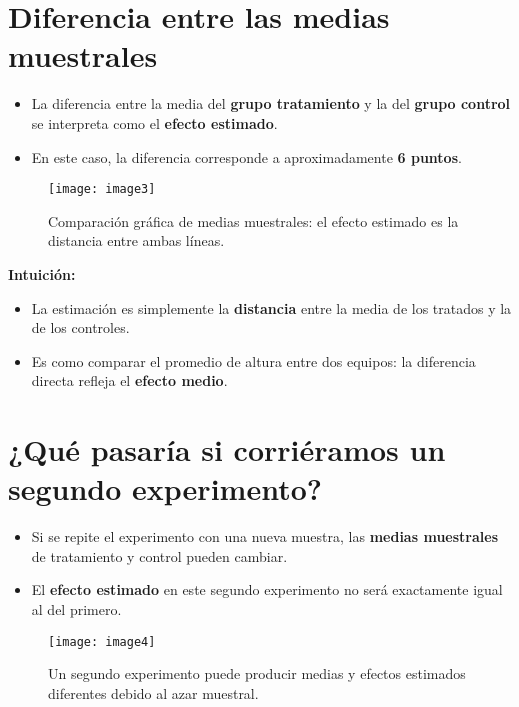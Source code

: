 \documentclass[12pt]{article}
\begin{document}
\section*{\noindent\textbf{Diferencia entre las medias muestrales}}

\begin{itemize}
    \item La diferencia entre la media del \textbf{grupo tratamiento} y la del \textbf{grupo control} se interpreta como el \textbf{efecto estimado}.
    \item En este caso, la diferencia corresponde a aproximadamente \textbf{6 puntos}.
\end{itemize}

\begin{figure}[H]
\centering
\texttt{[image: image3]}
\caption{\footnotesize Comparación gráfica de medias muestrales: el efecto estimado es la distancia entre ambas líneas.}
\end{figure}

\textbf{Intuición:}
\begin{itemize}
    \item La estimación es simplemente la \textbf{distancia} entre la media de los tratados y la de los controles.
    \item Es como comparar el promedio de altura entre dos equipos: la diferencia directa refleja el \textbf{efecto medio}.
\end{itemize}

\section*{\noindent\textbf{¿Qué pasaría si corriéramos un segundo experimento?}}

\begin{itemize}
    \item Si se repite el experimento con una nueva muestra, las \textbf{medias muestrales} de tratamiento y control pueden cambiar.
    \item El \textbf{efecto estimado} en este segundo experimento no será exactamente igual al del primero.
\end{itemize}

\begin{figure}[H]
\centering
\texttt{[image: image4]}
\caption{\footnotesize Un segundo experimento puede producir medias y efectos estimados diferentes debido al azar muestral.}
\end{figure}
\end{document}
